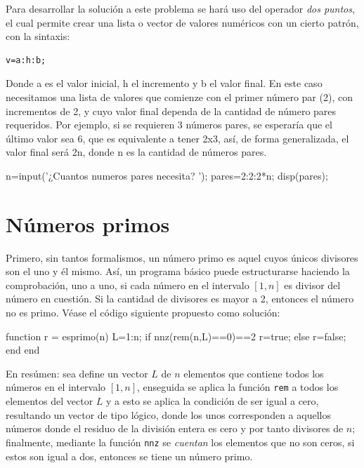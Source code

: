 Para desarrollar la solución a este problema se hará uso del operador {\it dos puntos}, el cual 
permite crear una lista o vector de valores numéricos con un cierto patrón, con la sintaxis:

\begin{verbatim}
v=a:h:b;
\end{verbatim}

Donde a es el valor inicial, h el incremento y b el valor final. En este caso necesitamos una lista 
de valores que comienze con el primer número par (2), con incrementos de 2, y cuyo valor final dependa 
de la cantidad de número pares requeridos. Por ejemplo, si se requieren 3 números pares, se esperaría que 
el último valor sea 6, que es equivalente a tener 2x3, así, de forma generalizada, el valor final será 
2n, donde n es la cantidad de números pares.

\begin{matlab}
n=input('¿Cuantos numeros pares necesita? ');
pares=2:2:2*n;
disp(pares);
\end{matlab}


\section{Números primos} 


\sol

Primero, sin tantos formalismos, un número primo es aquel cuyos únicos divisores son el uno y él mismo. 
Así, un programa básico puede estructurarse haciendo la comprobación, uno a uno, si cada número en el intervalo 
$[1, n]$ es divisor del número en cuestión. Si la cantidad de divisores es mayor a 2, entonces el número 
no es primo. Véase el código siguiente propuesto como solución:

\begin{matlab}
function r = esprimo(n)
L=1:n;
if nnz(rem(n,L)==0)==2
    r=true;
else
    r=false;
end
end
\end{matlab}

En resúmen: sea define un vector $L$ de $n$ elementos que contiene todos los números en el intervalo $[1,n]$, 
enseguida se aplica la función {\tt rem} a todos los elementos del vector $L$ y a esto se aplica la condición 
de ser igual a cero, resultando un vector de tipo lógico, donde los unos corresponden a aquellos números donde 
el residuo de la división entera es cero y por tanto divisores de $n$; finalmente, mediante la función 
{\tt nnz} se {\it cuentan} los elementos que no son ceros, si estos son igual a dos, entonces se tiene un 
número primo.

